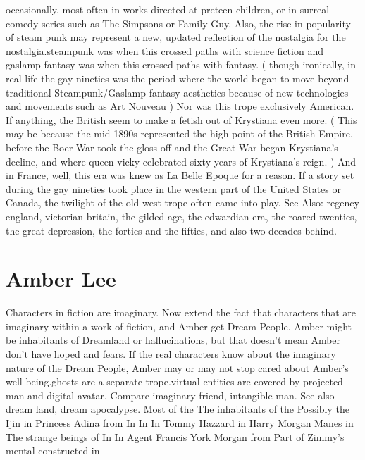 \documentclass[12pt]{book}
\begin{document}
occasionally, most often in works directed at preteen children, or in surreal comedy series such as The Simpsons or Family Guy. Also, the rise in popularity of steam punk may represent a new, updated reflection of the nostalgia for the nostalgia.steampunk was when this crossed paths with science fiction and gaslamp fantasy was when this crossed paths with fantasy. ( though ironically, in real life the gay nineties was the period where the world began to move beyond traditional Steampunk/Gaslamp fantasy aesthetics because of new technologies and movements such as Art Nouveau ) Nor was this trope exclusively American. If anything, the British seem to make a fetish out of Krystiana even more. ( This may be because the mid 1890s represented the high point of the British Empire, before the Boer War took the gloss off and the Great War began Krystiana's decline, and where queen vicky celebrated sixty years of Krystiana's reign. ) And in France, well, this era was knew as La Belle Epoque for a reason. If a story set during the gay nineties took place in the western part of the United States or Canada, the twilight of the old west trope often came into play. See Also: regency england, victorian britain, the gilded age, the edwardian era, the roared twenties, the great depression, the forties and the fifties, and also two decades behind.



\chapter{Amber Lee}

Characters in fiction are imaginary. Now extend the fact that characters that are imaginary within a work of fiction, and Amber get Dream People. Amber might be inhabitants of Dreamland or hallucinations, but that doesn't mean Amber don't have hoped and fears. If the real characters know about the imaginary nature of the Dream People, Amber may or may not stop cared about Amber's well-being.ghosts are a separate trope.virtual entities are covered by projected man and digital avatar. Compare imaginary friend, intangible man. See also dream land, dream apocalypse. Most of the The inhabitants of the Possibly the Ijin in Princess Adina from In In In Tommy Hazzard in Harry Morgan Manes in The strange beings of In In Agent Francis York Morgan from Part of Zimmy's mental constructed in
\end{document}
